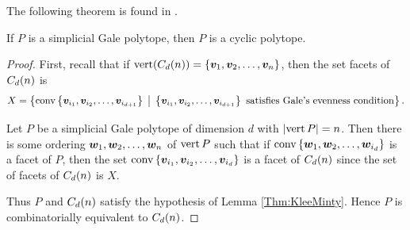 The following theorem is found in \cite{BayerBisz}.

\begin{Theorem}\label{Thm:SimpGale}
    If \(P\) is a simplicial Gale polytope, then \(P\) is a cyclic polytope.
\end{Theorem}
\begin{proof}
    First, recall that if \(\vrt(\cyc nd)=\seta{\ve v_1,\ve v_2\dc\ve v_n}\), then the set facets of \(\cyc{n}d\) is
        \[
            X=\setb{\conv\seta{\ve v_{i_1},\ve v_{i_2}\dc\ve v_{i_{d+1}}}}{\seta{\ve v_{i_1},\ve v_{i_2}\dc\ve v_{i_{d+1}}}\text{ satisfies Gale's evenness condition}}.
        \]

    Let \(P\) be a simplicial Gale polytope of dimension \(d\) with \(\card{\vrt{P}}=n\).  Then there is some ordering \(\ve w_1, \ve w_2\dc\ve w_n\) of \(\vrt P\) such that if \(\conv\seta{\ve w_1,\ve w_2\dc\ve w_{i_{d}}}\) is a facet of \(P\), then the set \(\conv\seta{\ve v_{i_1},\ve v_{i_2}\dc\ve v_{i_{d}}}\) is a facet of \(\cyc nd\) since the set of facets of \(\cyc nd\) is \(X\).

    Thus \(P\) and \(\cyc nd\) satisfy the hypothesis of Lemma \ref{Thm:KleeMinty}.  Hence \(P\) is combinatorially equivalent to \(\cyc nd\).
\end{proof}

